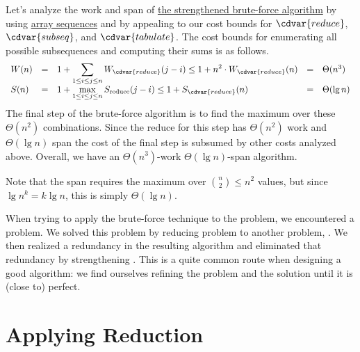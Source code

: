 \begin{flex}
\begin{gram}
%
Let's analyze the work and span of 
%
\href{alg:mcss::bf-alg::mcss-strong}{the strengthened brute-force algorithm} by using 
%
\href{sec:sequences::cost::arrays}{array sequences}
%
and by appealing to our cost bounds for
$\cdvar{reduce}$, $\cdvar{subseq}$, and $\cdvar{tabulate}$.
%
The cost bounds for enumerating all possible subsequences and
computing their sums is as follows.
%
\[
\begin{array}{lllll}
  W(n) & = & 1 + \displaystyle\sum_{1 \leq i\leq j\leq n} W_{\cdvar{reduce}}(j-i) \leq
           1 + n^2 \cdot W_{\cdvar{reduce}}(n) 
       & = & \Theta(n^3) 
\\
  S(n) & = & 1 + \displaystyle\max_{1 \leq i\leq j\leq n} S_{\textrm{reduce}}(j-i) \leq 
           1 + S_{\cdvar{reduce}}(n) 
       & = & \Theta(\lg n) 
\end{array}
\]
%
The final step of the brute-force algorithm is to find the maximum
over these $\Theta(n^2)$ combinations.
%
Since the reduce for this step has $\Theta(n^2)$ work and $\Theta(\lg n)$
span
%
 the cost of the final step is subsumed by other costs analyzed
above.  
%
Overall, we have an $\Theta(n^3)$-work $\Theta(\lg n)$-span algorithm.
\end{gram}

\begin{note}
Note that the span requires the maximum over
%
$\binom{n}{2} \leq n^2$ values, 
%
but since $\lg n^k = k \lg n$, this is simply
%
$\Theta(\lg n)$.
\end{note}
\end{flex}



\begin{gram}[Summary]
  When trying to apply the brute-force technique to the \MCSS{} problem,
  we encountered a problem.  We solved this problem by reducing \MCSS{}
  problem to another problem, \MCS{}. We then realized a redundancy in
  the resulting algorithm and eliminated that redundancy by
  strengthening \MCS{}.  This is a quite common route when designing a
  good algorithm: we find ourselves refining the problem and the
  solution until it is (close to) perfect.
\end{gram}

\section{Applying Reduction}
\label{sec:mcss::reduction}

